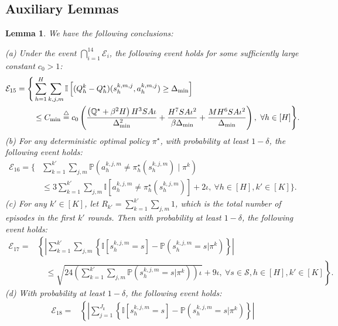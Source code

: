 \documentclass{article}
\newtheorem{lemma}{Lemma}[section]
\def\dmin{\Delta_{\textnormal{min}}}
\begin{document}
\subsection{Auxiliary Lemmas}
\begin{lemma}
    \label{concost}
      We have the following conclusions:

 (a) Under the event $\bigcap_{i=1}^{14}\mathcal{E}_i$, the following event holds for some sufficiently large constant $c_0 >1$:
          \begin{align*}
              \mathcal{E}_{15} = \Bigg\{ &\sum_{h=1}^H\sum_{k,j,m} \mathbb{I}\left[
        (Q_h^k- Q_h^\star)(s_h^{k,m,j},a_h^{k,m,j}) \geq \dmin\right]
         \\
         &\leq C_{\min} \overset{\triangle}={}c_0\left(\frac{\left(\mathbb{Q}^\star+\beta^2H\right)H^3SA\iota}{\dmin^2} + \frac{H^7SA\iota^2}{\beta\dmin}+ \frac{MH^6SA\iota^2}{\dmin}\right) ,\ \forall h\in[H]\Bigg\}.
          \end{align*}          
(b) For any deterministic optimal policy $\pi^{\star}$, with probability at least $1-\delta$, the following event holds:
        \begin{align*}
            \mathcal{E}_{16} = \Big\{&\sum_{k = 1}^{k'} \sum_{j,m} \mathbb{P}\left(a_h^{k,j,m} \neq \pi_h^{\star}(s_h^{k,j,m}) \mid \pi^k\right) \\& \leq 3\sum_{k = 1}^{k'} \sum_{j,m}\mathbb{I}\left[a_h^{k,j,m} \neq \pi_h^{\star}(s_h^{k,j,m}) \right]+ 2\iota,\ \forall h\in[H], k' \in [K]\Big\}.
        \end{align*}    
(c) For any $k' \in [K]$, let $R_{k'} = \sum_{k = 1}^{k'} \sum_{j,m} 1$, which is the total number of episodes in the first $k'$ rounds. Then with probability at least $1-\delta$, the following event holds:
         \begin{align*}
\mathcal{E}_{17} = &\left\{ 
    \left|\sum_{k = 1}^{k'} \sum_{j,m}\left\{\mathbb{I}\left[s_{h}^{k,j,m} = s\right] - \mathbb{P}\left(s_{h}^{k,j,m} = s | \pi^k\right)\right\}\right| \right. \\
    &\quad \left. \leq \sqrt{24\left(\sum_{k = 1}^{k'} \sum_{j,m}\mathbb{P}\left(s_{h}^{k,j,m} = s | \pi^k\right)\right)\iota} + 9\iota, \ \forall s \in \mathcal{S}, h \in [H], k' \in [K] \right\}.
\end{align*}
(d) With probability at least $1-\delta$, the following event holds:
         \begin{align*}
\mathcal{E}_{18} = &\left\{ 
    \left|\sum_{j = 1}^{J_k}\left\{\mathbb{I}\left[s_{h}^{k,j,m} = s\right] - \mathbb{P}\left(s_{h}^{k,j,m} = s | \pi^k\right)\right\}\right| \right. \\

\end{align*}
\end{lemma}
\end{document}
